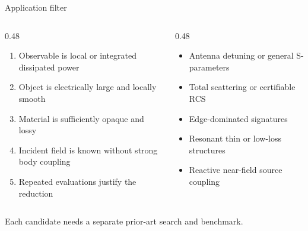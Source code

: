 \documentclass[aspectratio=169,10pt]{beamer}
\begin{document}
\begin{frame}{Application filter}
  \begin{columns}[T]
    \begin{column}{0.48\textwidth}
      \begin{evidencebox}[Eligibility]
        \begin{enumerate}\footnotesize\setlength\itemsep{3pt}
          \item Observable is local or integrated dissipated power
          \item Object is electrically large and locally smooth
          \item Material is sufficiently opaque and lossy
          \item Incident field is known without strong body coupling
          \item Repeated evaluations justify the reduction
        \end{enumerate}
      \end{evidencebox}
    \end{column}
    \begin{column}{0.48\textwidth}
      \begin{limitbox}[Exclusions]
        \begin{itemize}\footnotesize\setlength\itemsep{5pt}
          \item Antenna detuning or general S-parameters
          \item Total scattering or certifiable RCS
          \item Edge-dominated signatures
          \item Resonant thin or low-loss structures
          \item Reactive near-field source coupling
        \end{itemize}
      \end{limitbox}
    \end{column}
  \end{columns}
  \vspace{9pt}
  \begin{questionbox}\centering\small
    Each candidate needs a separate prior-art search and benchmark.
  \end{questionbox}
\end{frame}
\end{document}
